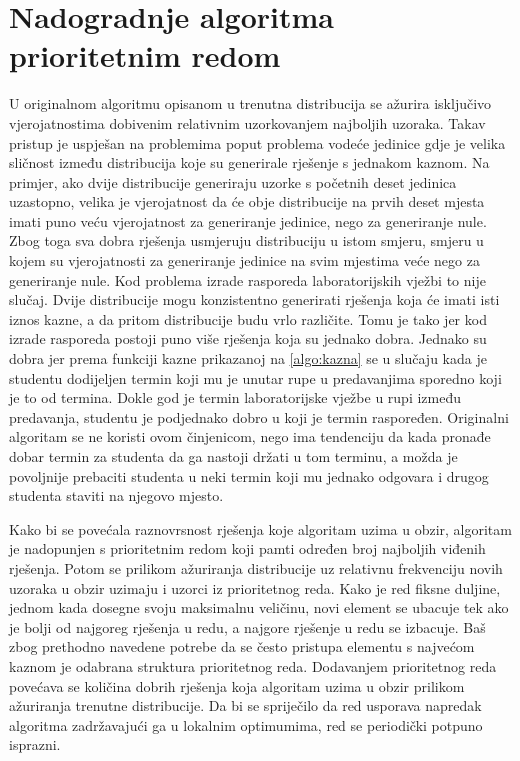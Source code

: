 \documentclass[times, utf8, zavrsni]{fer}
\begin{document}
\section{Nadogradnje algoritma prioritetnim redom}
\label{sec:prioritetni_red}
U originalnom algoritmu opisanom u \cite{DBLP:journals/tec/WuK14} trenutna distribucija se ažurira isključivo vjerojatnostima dobivenim relativnim
uzorkovanjem najboljih uzoraka. Takav pristup je uspješan na problemima poput problema vodeće jedinice gdje je velika sličnost
između distribucija koje su generirale rješenje s jednakom kaznom. Na primjer, ako dvije distribucije generiraju uzorke s početnih
deset jedinica uzastopno, velika je vjerojatnost da će obje distribucije na prvih deset mjesta imati puno veću vjerojatnost
za generiranje jedinice, nego za generiranje nule. Zbog toga sva dobra rješenja usmjeruju distribuciju u istom smjeru,
smjeru u kojem su vjerojatnosti za generiranje jedinice na svim mjestima veće nego za generiranje nule.
Kod problema izrade rasporeda laboratorijskih vježbi to nije slučaj. Dvije
distribucije mogu konzistentno generirati rješenja koja će imati isti iznos kazne, a da pritom distribucije budu vrlo različite.
Tomu je tako jer kod izrade rasporeda postoji puno više rješenja koja su jednako dobra. Jednako su dobra jer prema funkciji
kazne prikazanoj na \ref{algo:kazna} se u slučaju kada je studentu dodijeljen termin koji mu je unutar rupe u predavanjima
sporedno koji je to od termina. Dokle god je termin laboratorijske vježbe u rupi između predavanja, studentu je podjednako dobro
u koji je termin raspoređen. Originalni algoritam se ne koristi ovom činjenicom, nego ima tendenciju da kada pronađe dobar termin
za studenta da ga nastoji držati u tom terminu, a možda je povoljnije prebaciti studenta u neki termin koji mu jednako odgovara
i drugog studenta staviti na njegovo mjesto.

Kako bi se povećala raznovrsnost rješenja koje algoritam uzima u obzir, algoritam je nadopunjen s prioritetnim redom
koji pamti određen broj najboljih viđenih rješenja. Potom se prilikom ažuriranja distribucije uz relativnu frekvenciju novih uzoraka
u obzir uzimaju i uzorci iz prioritetnog reda. Kako je red fiksne duljine, jednom kada dosegne svoju maksimalnu veličinu,
novi element se ubacuje tek ako je bolji od najgoreg rješenja u redu, a najgore rješenje u redu se izbacuje. Baš zbog
prethodno navedene potrebe da se često pristupa elementu s najvećom kaznom je odabrana struktura prioritetnog reda. Dodavanjem
prioritetnog reda povećava se količina dobrih rješenja koja algoritam uzima u obzir prilikom ažuriranja trenutne distribucije.
Da bi se spriječilo da red usporava napredak algoritma zadržavajući ga u lokalnim optimumima, red se periodički potpuno isprazni.
\end{document}

